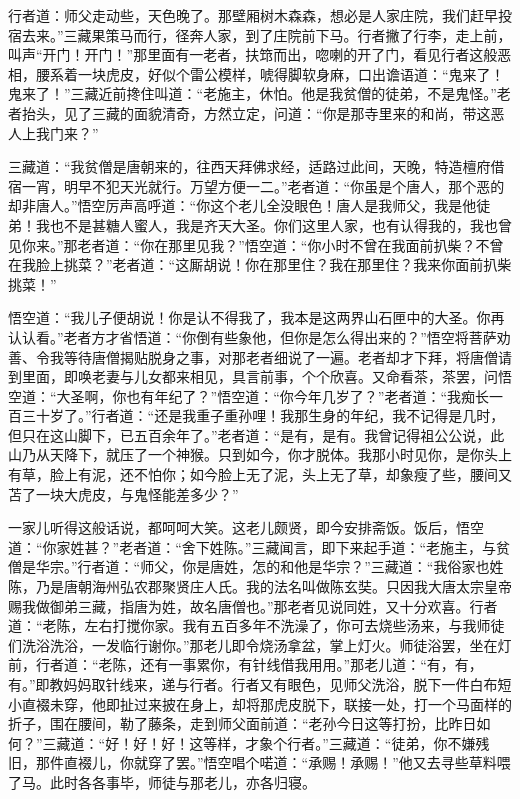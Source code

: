 \documentclass[12pt]{lsbook}
\begin{document}
行者道：师父走动些，天色晚了。那壁厢树木森森，想必是人家庄院，我们赶早投宿去来。”三藏果策马而行，径奔人家，到了庄院前下马。行者撇了行李，走上前，叫声“开门！开门！”那里面有一老者，扶筇而出，唿喇的开了门，看见行者这般恶相，腰系着一块虎皮，好似个雷公模样，唬得脚软身麻，口出谵语道：“鬼来了！鬼来了！”三藏近前搀住叫道：“老施主，休怕。他是我贫僧的徒弟，不是鬼怪。”老者抬头，见了三藏的面貌清奇，方然立定，问道：“你是那寺里来的和尚，带这恶人上我门来？”

三藏道：“我贫僧是唐朝来的，往西天拜佛求经，适路过此间，天晚，特造檀府借宿一宵，明早不犯天光就行。万望方便一二。”老者道：“你虽是个唐人，那个恶的却非唐人。”悟空厉声高呼道：“你这个老儿全没眼色！唐人是我师父，我是他徒弟！我也不是甚糖人蜜人，我是齐天大圣。你们这里人家，也有认得我的，我也曾见你来。”那老者道：“你在那里见我？”悟空道：“你小时不曾在我面前扒柴？不曾在我脸上挑菜？”老者道：“这厮胡说！你在那里住？我在那里住？我来你面前扒柴挑菜！”

悟空道：“我儿子便胡说！你是认不得我了，我本是这两界山石匣中的大圣。你再认认看。”老者方才省悟道：“你倒有些象他，但你是怎么得出来的？”悟空将菩萨劝善、令我等待唐僧揭贴脱身之事，对那老者细说了一遍。老者却才下拜，将唐僧请到里面，即唤老妻与儿女都来相见，具言前事，个个欣喜。又命看茶，茶罢，问悟空道：“大圣啊，你也有年纪了？”悟空道：“你今年几岁了？”老者道：“我痴长一百三十岁了。”行者道：“还是我重子重孙哩！我那生身的年纪，我不记得是几时，但只在这山脚下，已五百余年了。”老者道：“是有，是有。我曾记得祖公公说，此山乃从天降下，就压了一个神猴。只到如今，你才脱体。我那小时见你，是你头上有草，脸上有泥，还不怕你；如今脸上无了泥，头上无了草，却象瘦了些，腰间又苫了一块大虎皮，与鬼怪能差多少？”

一家儿听得这般话说，都呵呵大笑。这老儿颇贤，即今安排斋饭。饭后，悟空道：“你家姓甚？”老者道：“舍下姓陈。”三藏闻言，即下来起手道：“老施主，与贫僧是华宗。”行者道：“师父，你是唐姓，怎的和他是华宗？”三藏道：“我俗家也姓陈，乃是唐朝海州弘农郡聚贤庄人氏。我的法名叫做陈玄奘。只因我大唐太宗皇帝赐我做御弟三藏，指唐为姓，故名唐僧也。”那老者见说同姓，又十分欢喜。行者道：“老陈，左右打搅你家。我有五百多年不洗澡了，你可去烧些汤来，与我师徒们洗浴洗浴，一发临行谢你。”那老儿即令烧汤拿盆，掌上灯火。师徒浴罢，坐在灯前，行者道：“老陈，还有一事累你，有针线借我用用。”那老儿道：“有，有，有。”即教妈妈取针线来，递与行者。行者又有眼色，见师父洗浴，脱下一件白布短小直裰未穿，他即扯过来披在身上，却将那虎皮脱下，联接一处，打一个马面样的折子，围在腰间，勒了藤条，走到师父面前道：“老孙今日这等打扮，比昨日如何？”三藏道：“好！好！好！这等样，才象个行者。”三藏道：“徒弟，你不嫌残旧，那件直裰儿，你就穿了罢。”悟空唱个喏道：“承赐！承赐！”他又去寻些草料喂了马。此时各各事毕，师徒与那老儿，亦各归寝。
\end{document}

